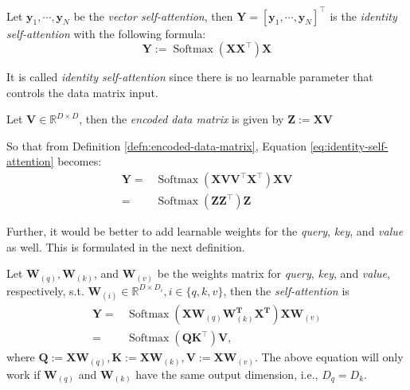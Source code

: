 \begin{defn}
    Let $\mathbf{y}_1,\cdots,\mathbf{y}_N$ be the \textit{vector self-attention}, then $\mathbf{Y}=[\mathbf{y}_1,\cdots,\mathbf{y}_N]^{\top}$ is the \textit{identity self-attention} with the following formula:
    \begin{equation}\label{eq:identity-self-attention}
        \mathbf{Y}:=\operatorname{Softmax}(\mathbf{X}\mathbf{X}^{\top})\mathbf{X}
    \end{equation}
\end{defn}

\begin{remark}
    It is called \textit{identity self-attention} since there is no learnable parameter that controls the data matrix input.
\end{remark}

\begin{defn}\label{defn:encoded-data-matrix}
    Let $\mathbf{V}\in\mathbb{R}^{D\times D}$, then the \textit{encoded data matrix} is given by $\mathbf{Z}:=\mathbf{X}\mathbf{V}$
\end{defn}

So that from Definition \ref{defn:encoded-data-matrix}, Equation \ref{eq:identity-self-attention} becomes:
\begin{align}
    \mathbf{Y}=&\operatorname{Softmax}(\mathbf{X}\mathbf{V}\mathbf{V}^{\top}\mathbf{X}^{\top})\mathbf{X}\mathbf{V}\\
    =&\operatorname{Softmax}(\mathbf{Z}\mathbf{Z}^{\top})\mathbf{Z}
\end{align}

Further, it would be better to add learnable weights for the \textit{query}, \textit{key}, and \textit{value} as well. This is formulated in the next definition.

\begin{defn}\label{defn:self-attention}
    Let $\mathbf{W}_{(q)},\mathbf{W}_{(k)}$, and $\mathbf{W}_{(v)}$ be the weights matrix for \textit{query}, \textit{key}, and \textit{value}, respectively, s.t. $\mathbf{W}_{(i)}\in\mathbb{R}^{D\times D_i},i\in\{q,k,v\}$, then the \textit{self-attention} is 
    \begin{align}
        \mathbf{Y}=&\operatorname{Softmax}(\mathbf{X}\mathbf{W}_{(q)}\mathbf{W}_{(k)}^{\mathbf{T}}\mathbf{X}^{\mathbf{T}})\mathbf{X}\mathbf{W}_{(v)}\\
        =&\operatorname{Softmax}(\mathbf{Q}\mathbf{K}^{\top})\mathbf{V},
    \end{align}
    where $\mathbf{Q}:=\mathbf{X}\mathbf{W}_{(q)},\mathbf{K}:=\mathbf{X}\mathbf{W}_{(k)},\mathbf{V}:=\mathbf{X}\mathbf{W}_{(v)}$. The above equation will only work if $\mathbf{W}_{(q)}$ and $\mathbf{W}_{(k)}$ have the same output dimension, i.e., $D_q = D_k$.
\end{defn}

